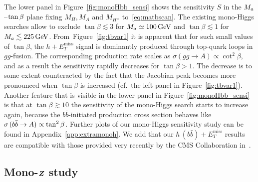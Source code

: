 \documentclass[a4paper, 11pt,notoc]{article}
\newcommand{\MET}{\ensuremath{E_T^\mathrm{miss}}\xspace}
\newcommand{\mA}{\ensuremath{M_{A}}\xspace}
\newcommand{\ma}{\ensuremath{M_{a}}\xspace}
\newcommand{\mH}{\ensuremath{M_{H}}\xspace}
\newcommand{\mHc}{\ensuremath{M_{H^{\pm}}}\xspace}
\def\bm#1{\mbox{\boldmath$#1$\unboldmath}}
\begin{document}
The lower panel in Figure~\ref{fig:monoHbb_sensi} shows the sensitivity $S$ in the $\ma\hspace{0.25mm}$--$\hspace{0.25mm}\tan \beta$ plane fixing  $\mH, \mA$ and  $\mHc$ to~\eqref{eq:matbscan}. The existing mono-Higgs searches allow to exclude $\tan \beta \lesssim 3$ for $M_a \simeq 100 \, {\rm GeV}$ and $\tan \beta \lesssim 1$ for $M_a \lesssim 225 \, {\rm GeV}$. From~Figure~\ref{fig:tbvar1} it is apparent that for such small values of $\tan \beta$, the $h + \MET$ signal is dominantly produced through top-quark loops in $gg$-fusion. The corresponding production rate scales as $\sigma \left ( gg \to A \right ) \propto \cot^2 \beta$, and as a result the sensitivity rapidly decreases for $\tan \beta > 1$. The decrease is to some extent counteracted by the fact that the Jacobian peak becomes more pronounced when  $\tan \beta$ is increased (cf.~the left panel in Figure~\ref{fig:tbvar1}). Another feature that is visible in the  lower panel in Figure~\ref{fig:monoHbb_sensi}  is that at $\tan \beta \gtrsim 10$ the sensitivity of the mono-Higgs search  starts to increase again, because the $b \bar b$-initiated production cross section behaves like $\sigma \hspace{0.5mm} ( b \bar b \to A  ) \propto \tan^2 \beta$. Further plots of our mono-Higgs sensitivity study can be found in Appendix~\ref{app:extramonoh}.  We add that our $h \, (b \bar b) + \MET$ results are compatible with those provided very recently by the CMS Collaboration in~\cite{CMS-PAS-EXO-16-050}. 

\subsection[Mono-$Z$ study]{Mono-$\bm{Z}$ study}
\label{sec:sensi_monozll}
\end{document}
